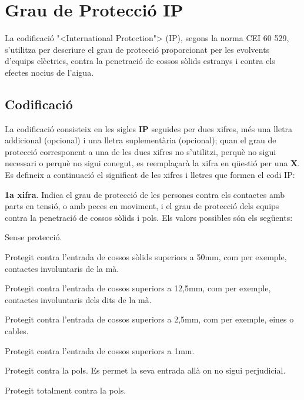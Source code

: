 \chapter{Grau de Protecci\'{o} IP}   

La codificaci\'{o} {"<}International Protection{">} (\textsf{IP}), segons la
norma \textsf{CEI 60 529}, s'utilitza per descriure el grau de
protecci\'{o}  proporcionat per les evolvents d'equips el\`{e}ctrics, contra
la penetraci\'{o} de cossos s\`{o}lids estranys i contra els efectes nocius
de l'aigua.

\section{Codificaci\'{o}}
 La codificaci\'{o} consisteix en les sigles \textsf{\textbf{IP}}
seguides per dues xifres, m\'{e}s una lletra addicional (opcional) i una
lletra suplement\`{a}ria (opcional); quan el grau de protecci\'{o}
corresponent a una de les dues xifres no s'utilitzi, perqu\`{e} no sigui
necessari o perqu\`{e} no sigui conegut, es reempla\c{c}ar\`{a} la xifra en
q\"{u}esti\'{o} per una \textsf{\textbf{X}}. Es defineix a continuaci\'{o} el
significat de les xifres i lletres que formen el codi \textsf{IP}:

\textbf{1a xifra}. Indica el grau de protecci\'{o} de les persones contra els contactes amb
parts en tensi\'{o}, o amb peces en moviment, i el grau de protecci\'{o} dels equips contra la
penetraci\'{o} de cossos s\`{o}lids i pols. Els valors possibles s\'{o}n els seg\"{u}ents:
\begin{multicols}{2}
\begin{list}{}
   {\setlength{\labelwidth}{4.5mm} \setlength{\leftmargin}{4.5mm} \setlength{\labelsep}{2mm}}
   \item[\textbf{0}] Sense protecci\'{o}.
   \item[\textbf{1}] Protegit contra l'entrada de cossos s\`{o}lids superiors a 50\unit{mm},
   com per exemple,   contactes involuntaris de la m\`{a}.
   \item[\textbf{2}] Protegit contra l'entrada de cossos superiors a 12,5\unit{mm}, com per exemple,
   contactes involuntaris dels dits de la m\`{a}.
   \item[\textbf{3}] Protegit contra l'entrada de cossos superiors a 2,5\unit{mm},
   com per exemple, eines o cables.
   \item[\textbf{4}] Protegit contra l'entrada de cossos superiors a 1\unit{mm}.
   \item[\textbf{5}] Protegit contra la pols. Es permet la seva entrada all\`{a} on no sigui perjudicial.
   \item[\textbf{6}] Protegit totalment contra la pols.
\end{list}
\end{multicols}

